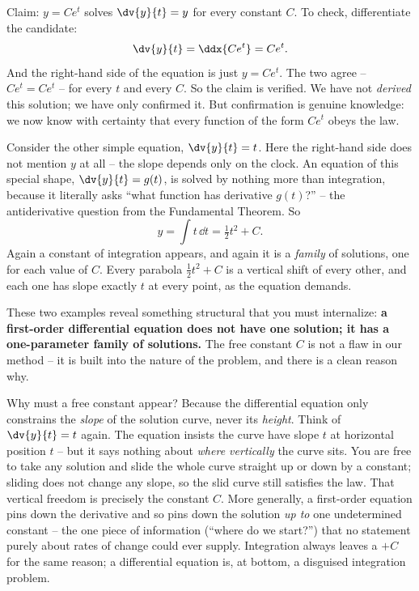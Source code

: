 \begin{example}
\label{ch36:ex-verify}
Claim: $y = Ce^t$ solves $\dv{y}{t} = y$ for every constant $C$. To check, differentiate the candidate:
\[
  \dv{y}{t} = \ddx{Ce^t} = Ce^t.
\]
And the right-hand side of the equation is just $y = Ce^t$. The two agree -- $Ce^t = Ce^t$ -- for every $t$ and every $C$. So the claim is verified. We have not \emph{derived} this solution; we have only confirmed it. But confirmation is genuine knowledge: we now know with certainty that every function of the form $Ce^t$ obeys the law.
\end{example}

\begin{example}
\label{ch36:ex-integrate}
Consider the other simple equation, $\dv{y}{t} = t$. Here the right-hand side does not mention $y$ at all -- the slope depends only on the clock. An equation of this special shape, $\dv{y}{t} = g(t)$, is solved by nothing more than integration, because it literally asks ``what function has derivative $g(t)$?'' -- the antiderivative question from the Fundamental Theorem. So
\[
  y = \int t \,\dd t = \tfrac{1}{2}t^2 + C.
\]
Again a constant of integration appears, and again it is a \emph{family} of solutions, one for each value of $C$. Every parabola $\tfrac{1}{2}t^2 + C$ is a vertical shift of every other, and each one has slope exactly $t$ at every point, as the equation demands.
\end{example}

These two examples reveal something structural that you must internalize: \textbf{a first-order differential equation does not have one solution; it has a one-parameter family of solutions.} The free constant $C$ is not a flaw in our method -- it is built into the nature of the problem, and there is a clean reason why.

\begin{whybox}
Why must a free constant appear? Because the differential equation only constrains the \emph{slope} of the solution curve, never its \emph{height}. Think of $\dv{y}{t} = t$ again. The equation insists the curve have slope $t$ at horizontal position $t$ -- but it says nothing about \emph{where vertically} the curve sits. You are free to take any solution and slide the whole curve straight up or down by a constant; sliding does not change any slope, so the slid curve still satisfies the law. That vertical freedom is precisely the constant $C$. More generally, a first-order equation pins down the derivative and so pins down the solution \emph{up to} one undetermined constant -- the one piece of information (``where do we start?'') that no statement purely about rates of change could ever supply. Integration always leaves a $+C$ for the same reason; a differential equation is, at bottom, a disguised integration problem.
\end{whybox}

